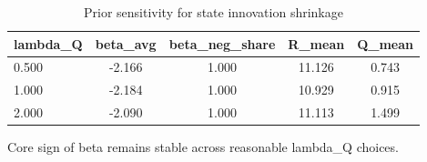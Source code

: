 \begin{table}[!htbp]
\centering
\caption{Prior sensitivity for state innovation shrinkage}
\label{tab:prior_sensitivity}
\begin{threeparttable}
\begin{tabular}{lcccc}
\toprule
lambda\_Q & beta\_avg & beta\_neg\_share & R\_mean & Q\_mean \\
\midrule
0.500 & -2.166 & 1.000 & 11.126 & 0.743 \\
1.000 & -2.184 & 1.000 & 10.929 & 0.915 \\
2.000 & -2.090 & 1.000 & 11.113 & 1.499 \\
\bottomrule
\end{tabular}
\begin{tablenotes}[flushleft]
\footnotesize
\item Core sign of beta remains stable across reasonable lambda\_Q choices.
\end{tablenotes}
\end{threeparttable}
\end{table}
